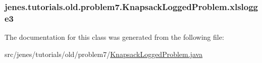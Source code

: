 \hypertarget{classjenes_1_1tutorials_1_1old_1_1problem7_1_1_knapsack_logged_problem_a6ee4f7b8ca8aab4c999674a9a6a052e5}{
\subsubsection[{xlslogge3}]{ jenes.\-tutorials.\-old.\-problem7.\-Knapsack\-Logged\-Problem.\-xlslogge3\hspace{0.3cm}{\ttfamily [private]}}}\label{classjenes_1_1tutorials_1_1old_1_1problem7_1_1_knapsack_logged_problem_a6ee4f7b8ca8aab4c999674a9a6a052e5}


The documentation for this class was generated from the following file\-:\begin{DoxyCompactItemize}
\item 
src/jenes/tutorials/old/problem7/\hyperlink{old_2problem7_2_knapsack_logged_problem_8java}{Knapsack\-Logged\-Problem.\-java}\end{DoxyCompactItemize}

